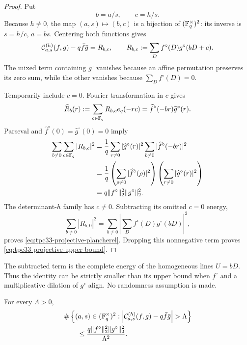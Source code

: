 \begin{proof}
Put
\begin{equation}
 b=a/s,\qquad c=h/s.
 \label{eq:tpc33-projective-coordinates}
\end{equation}
Because \(h\ne0\), the map
\((a,s)\mapsto(b,c)\) is a bijection of
\((\mathbb F_q^\times)^2\): its inverse is
\(s=h/c\), \(a=bs\).  Centering both functions gives
\begin{equation}
 \mathcal C_{a,s}^{(h)}(f,g)-q\bar f\bar g
 =R_{b,c},
 \qquad
 R_{b,c}:=\sum_Df^\circ(D)g^\circ(bD+c).
 \label{eq:tpc33-centered-affine-correlation}
\end{equation}
The mixed term containing \(g^\circ\) vanishes because an affine permutation
preserves its zero sum, while the other vanishes because
\(\sum_D f^\circ(D)=0\).

Temporarily include \(c=0\).  Fourier transformation in \(c\) gives
\begin{equation}
 \widehat R_b(r)
 :=\sum_{c\in\mathbb F_q}R_{b,c}e_q(-rc)
 =\widehat f^\circ(-br)\widehat g^\circ(r).
 \label{eq:tpc33-R-fourier}
\end{equation}
Parseval and \(\widehat f^\circ(0)=\widehat g^\circ(0)=0\) imply
\begin{align}
 \sum_{b\ne0}\sum_{c\in\mathbb F_q}|R_{b,c}|^2
 &=\frac1q\sum_{r\ne0}|\widehat g^\circ(r)|^2
   \sum_{b\ne0}|\widehat f^\circ(-br)|^2
 \notag\\
 &=\frac1q
   \left(\sum_{\rho\ne0}|\widehat f^\circ(\rho)|^2\right)
   \left(\sum_{r\ne0}|\widehat g^\circ(r)|^2\right)
 \notag\\
 &=q\|f^\circ\|_2^2\|g^\circ\|_2^2.
 \label{eq:tpc33-complete-affine-energy}
\end{align}
The determinant-\(h\) family has \(c\ne0\).  Subtracting its omitted
\(c=0\) energy,
\[
 \sum_{b\ne0}|R_{b,0}|^2
 =\sum_{b\ne0}
   \left|\sum_Df^\circ(D)g^\circ(bD)\right|^2,
\]
proves \eqref{eq:tpc33-projective-plancherel}.  Dropping this nonnegative
term proves \eqref{eq:tpc33-projective-upper-bound}.
\end{proof}

\begin{remark}
The subtracted term is the complete energy of the homogeneous lines
\(U=bD\).  Thus the identity can be strictly smaller than its upper bound
when \(f^\circ\) and a multiplicative dilation of \(g^\circ\) align.  No
randomness assumption is made.
\end{remark}

\begin{corollary}
\label{cor:tpc33-exceptional-projective-directions}
For every \(\Lambda>0\),
\begin{align}
 &\#\left\{(a,s)\in(\F_q^\times)^2:
 \left|\cC_{a,s}^{(h)}(f,g)-q\bar f\bar g\right|>\Lambda
 \right\}
 \notag\\
 &\qquad\le
 \frac{q\|f^\circ\|_2^2\|g^\circ\|_2^2}{\Lambda^2}.
 \label{eq:tpc33-projective-exception-count}
\end{align}
\end{corollary}

